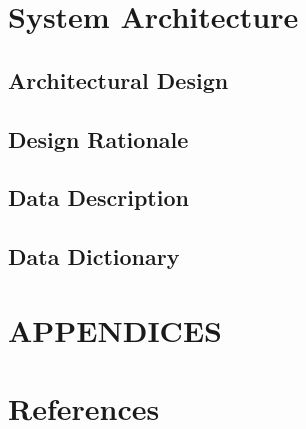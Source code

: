 \documentclass[12pt]{article}
\begin{document}
\section{System Architecture}
\subsection{Architectural Design}

\subsection{Design Rationale}

\subsection{Data Description}

\subsection {Data Dictionary}

\section{APPENDICES}

\section {References}
\end{document}
